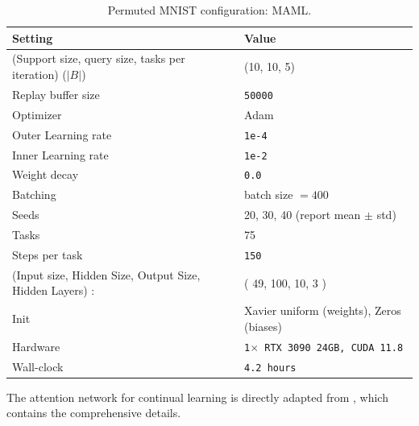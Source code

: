\documentclass{article}
\begin{document}
\begin{table}[H]
\centering
\footnotesize
\caption{Permuted MNIST configuration: MAML.}
\label{tab:pmnist_maml}
\begin{tabular}{@{}ll@{}}
\toprule
Setting & Value \\ \midrule
(Support size, query size, tasks per iteration) ($|B|$) & (10, 10, 5) \\
Replay buffer size & \texttt{50000} \\
Optimizer & Adam \\
Outer Learning rate & \texttt{1e-4} \\
Inner Learning rate & \texttt{1e-2} \\
Weight decay & \texttt{0.0} \\
Batching & batch size $=400$ \\
Seeds & 20, 30, 40 (report mean $\pm$ std) \\
Tasks & 75 \\
Steps per task & \texttt{150} \\
(Input size, Hidden Size, Output Size, Hidden Layers) : & ( 49, 100, 10, 3 ) \\ 
Init & Xavier uniform (weights), Zeros (biases) \\
Hardware & \texttt{1$\times$ RTX 3090 24GB, CUDA 11.8} \\
Wall-clock & \texttt{4.2 hours } \\
\bottomrule
\end{tabular}
\end{table}

\clearpage
The attention network for continual learning is directly adapted from \citep{wang2025replay}, which contains the comprehensive details.
\end{document}
